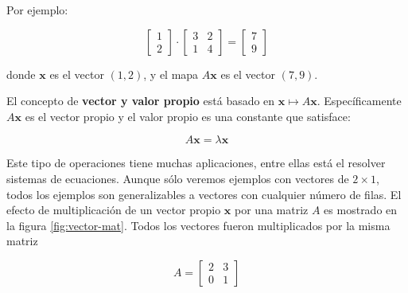 \documentclass[
]{book}
\begin{document}
Por ejemplo:

\begin{equation}
    \left[ 
    \begin{array}{c}
    1 \\ 2
    \end{array}
    \right]
    \cdot
    \left[
    \begin{array}{cc}
    3 & 2 \\
    1 & 4
    \end{array}
    \right] = 
    \left[
    \begin{array}{c}
    7 \\ 9
    \end{array}
    \right]
\end{equation}

donde \(\mathbf{x}\) es el vector \((1, 2)\), y el mapa \(A \mathbf{x}\) es el vector \((7, 9)\).

El concepto de \textbf{vector y valor propio} está basado en \(\mathbf{x} \mapsto A \mathbf{x}\). Específicamente \(A \mathbf{x}\) es el vector propio y el valor propio es una constante que satisface:

\begin{equation}
A \mathbf{x} = \lambda \mathbf{x} \label{eq:valor-propio}
\end{equation}

Este tipo de operaciones tiene muchas aplicaciones, entre ellas está el resolver sistemas de ecuaciones. Aunque sólo veremos ejemplos con vectores de \(2 \times 1\), todos los ejemplos son generalizables a vectores con cualquier número de filas. El efecto de multiplicación de un vector propio \(\mathbf{x}\) por una matriz \(A\) es mostrado en la figura \ref{fig:vector-mat}. Todos los vectores fueron multiplicados por la misma matriz

\[A= \left[
\begin{array}{cc}
2 & 3 \\
0 & 1
\end{array}
\right]\]
\end{document}
